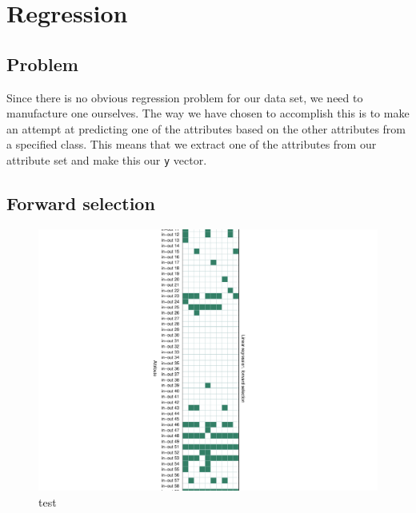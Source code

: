 \chapter{Regression}

\section{Problem}
Since there is no obvious regression problem for our data set, we need to manufacture one ourselves. The way we have chosen to accomplish this is to make an attempt at predicting one of the attributes based on the other attributes from a specified class. This means that we extract one of the attributes from our attribute set and make this our \texttt{y} vector.

\section{Forward selection}
\begin{figure}[H]
\centering
\includegraphics[width=\linewidth]{code/linear_regression_fs}
\caption{test\label{fig:linforward}}
\end{figure}



